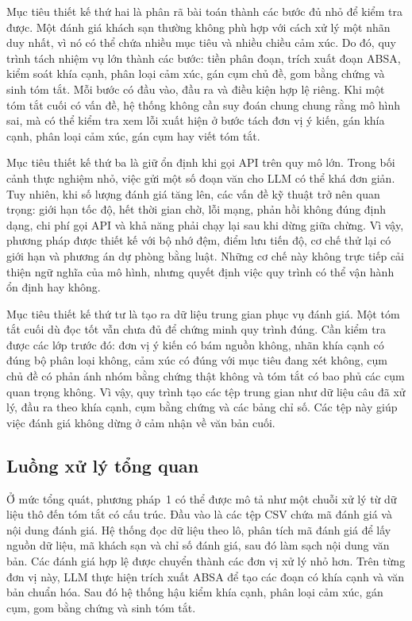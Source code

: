 \documentclass[12pt,a4paper]{report}
\begin{document}
Mục tiêu thiết kế thứ hai là phân rã bài toán thành các bước đủ nhỏ để kiểm tra được. Một đánh giá khách sạn thường không phù hợp với cách xử lý một nhãn duy nhất, vì nó có thể chứa nhiều mục tiêu và nhiều chiều cảm xúc. Do đó, quy trình tách nhiệm vụ lớn thành các bước: tiền phân đoạn, trích xuất đoạn ABSA, kiểm soát khía cạnh, phân loại cảm xúc, gán cụm chủ đề, gom bằng chứng và sinh tóm tắt. Mỗi bước có đầu vào, đầu ra và điều kiện hợp lệ riêng. Khi một tóm tắt cuối có vấn đề, hệ thống không cần suy đoán chung chung rằng mô hình sai, mà có thể kiểm tra xem lỗi xuất hiện ở bước tách đơn vị ý kiến, gán khía cạnh, phân loại cảm xúc, gán cụm hay viết tóm tắt.

Mục tiêu thiết kế thứ ba là giữ ổn định khi gọi API trên quy mô lớn. Trong bối cảnh thực nghiệm nhỏ, việc gửi một số đoạn văn cho LLM có thể khá đơn giản. Tuy nhiên, khi số lượng đánh giá tăng lên, các vấn đề kỹ thuật trở nên quan trọng: giới hạn tốc độ, hết thời gian chờ, lỗi mạng, phản hồi không đúng định dạng, chi phí gọi API và khả năng phải chạy lại sau khi dừng giữa chừng. Vì vậy, phương pháp được thiết kế với bộ nhớ đệm, điểm lưu tiến độ, cơ chế thử lại có giới hạn và phương án dự phòng bằng luật. Những cơ chế này không trực tiếp cải thiện ngữ nghĩa của mô hình, nhưng quyết định việc quy trình có thể vận hành ổn định hay không.

Mục tiêu thiết kế thứ tư là tạo ra dữ liệu trung gian phục vụ đánh giá. Một tóm tắt cuối dù đọc tốt vẫn chưa đủ để chứng minh quy trình đúng. Cần kiểm tra được các lớp trước đó: đơn vị ý kiến có bám nguồn không, nhãn khía cạnh có đúng bộ phân loại không, cảm xúc có đúng với mục tiêu đang xét không, cụm chủ đề có phản ánh nhóm bằng chứng thật không và tóm tắt có bao phủ các cụm quan trọng không. Vì vậy, quy trình tạo các tệp trung gian như dữ liệu câu đã xử lý, đầu ra theo khía cạnh, cụm bằng chứng và các bảng chỉ số. Các tệp này giúp việc đánh giá không dừng ở cảm nhận về văn bản cuối.

\subsection{Luồng xử lý tổng quan}

Ở mức tổng quát, phương pháp~1 có thể được mô tả như một chuỗi xử lý từ dữ liệu thô đến tóm tắt có cấu trúc. Đầu vào là các tệp CSV chứa mã đánh giá và nội dung đánh giá. Hệ thống đọc dữ liệu theo lô, phân tích mã đánh giá để lấy nguồn dữ liệu, mã khách sạn và chỉ số đánh giá, sau đó làm sạch nội dung văn bản. Các đánh giá hợp lệ được chuyển thành các đơn vị xử lý nhỏ hơn. Trên từng đơn vị này, LLM thực hiện trích xuất ABSA để tạo các đoạn có khía cạnh và văn bản chuẩn hóa. Sau đó hệ thống hậu kiểm khía cạnh, phân loại cảm xúc, gán cụm, gom bằng chứng và sinh tóm tắt.
\end{document}
